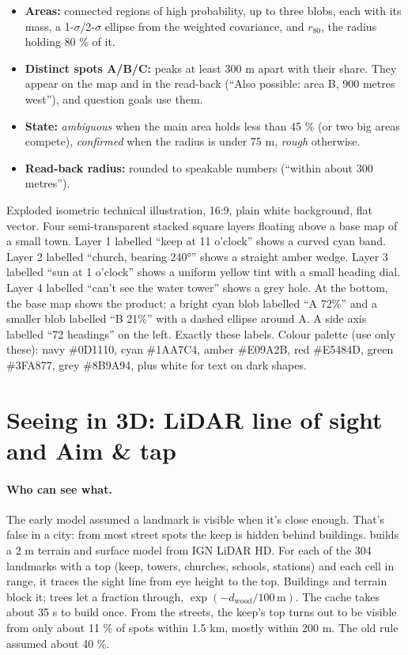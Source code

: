 \begin{itemize}
  \item \textbf{Areas:} connected regions of high probability, up to three blobs, each with its mass, a
        1-$\sigma$/2-$\sigma$ ellipse from the weighted covariance, and $r_{80}$, the radius holding 80 \% of it.
  \item \textbf{Distinct spots A/B/C:} peaks at least 300 m apart with their share. They appear on the map
        and in the read-back (``Also possible: area B, 900 metres west''), and question goals use them.
  \item \textbf{State:} \emph{ambiguous} when the main area holds less than 45 \% (or two big areas compete),
        \emph{confirmed} when the radius is under 75 m, \emph{rough} otherwise.
  \item \textbf{Read-back radius:} rounded to speakable numbers (``within about 300 metres'').
\end{itemize}

{Exploded isometric technical illustration, 16:9, plain white background, flat vector. Four semi-transparent stacked
square layers floating above a base map of a small town. Layer 1 labelled ``keep at 11 o'clock'' shows a curved
cyan band. Layer 2 labelled ``church, bearing 240°'' shows a straight amber wedge. Layer 3 labelled ``sun at
1 o'clock'' shows a uniform yellow tint with a small heading dial. Layer 4 labelled ``can't see the water tower''
shows a grey hole. At the bottom, the base map shows the product: a bright cyan blob labelled ``A 72\%'' and a
smaller blob labelled ``B 21\%'' with a dashed ellipse around A. A side axis labelled ``72 headings'' on the left.
Exactly these labels. Colour palette (use only these): navy \#0D1110, cyan \#1AA7C4, amber \#E09A2B, red \#E5484D, green \#3FA877, grey \#8B9A94, plus white for text on dark shapes.}

\section{Seeing in 3D: LiDAR line of sight and Aim \& tap}\label{sec:3d}

\paragraph{Who can see what.} The early model assumed a landmark is visible when it's close enough. That's
false in a city: from most street spots the keep is hidden behind buildings.  builds a 2 m
terrain and surface model from IGN LiDAR HD. For each of the 304 landmarks with a top (keep, towers,
churches, schools, stations) and each cell in range, it traces the sight line from eye height to the top.
Buildings and terrain block it; trees let a fraction through, $\exp(-d_{\text{wood}}/100\,\text{m})$. The cache
takes about 35 s to build once. From the streets, the keep's top turns out to be visible from only about
11 \% of spots within 1.5 km, mostly within 200 m. The old rule assumed about 40 \%.

